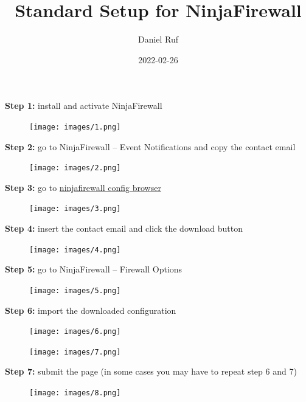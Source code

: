 \documentclass[a4paper]{article}
\title{Standard Setup for NinjaFirewall}\let\Title\@title
\author{Daniel Ruf}\let\Author\@author
\date{2022-02-26} \let\Date\@date
\newcommand{\Version}{1.3.1}
\begin{document}
\lhead{\Title}
\lfoot{v\Version}
\rfoot{\today}

\noindent


\noindent
\textbf{Step 1:} install and activate NinjaFirewall

\begin{figure}[H]
  \centering
  \texttt{[image: images/1.png]}
\end{figure}

\noindent
\textbf{Step 2:} go to NinjaFirewall -- Event Notifications and copy the contact email

\begin{figure}[H]
  \centering
  \texttt{[image: images/2.png]}
\end{figure}

\noindent
\textbf{Step 3:} go to \href{https://danielruf.github.io/ninjafirewall-config-browser/}{ninjafirewall config browser}

\begin{figure}[H]
  \centering
  \texttt{[image: images/3.png]}
\end{figure}

\newpage

\noindent
\textbf{Step 4:} insert the contact email and click the download button

\begin{figure}[H]
  \centering
  \texttt{[image: images/4.png]}
\end{figure}

\noindent
\textbf{Step 5:} go to NinjaFirewall -- Firewall Options

\begin{figure}[H]
  \centering
  \texttt{[image: images/5.png]}
\end{figure}

\noindent
\textbf{Step 6:} import the downloaded configuration

\begin{figure}[H]
  \centering
  \texttt{[image: images/6.png]}
\end{figure}

\begin{figure}[H]
  \centering
  \texttt{[image: images/7.png]}
\end{figure}

\noindent
\textbf{Step 7:} submit the page (in some cases you may have to repeat step 6 and 7)

\begin{figure}[H]
  \centering
  \texttt{[image: images/8.png]}
\end{figure}
\end{document}
